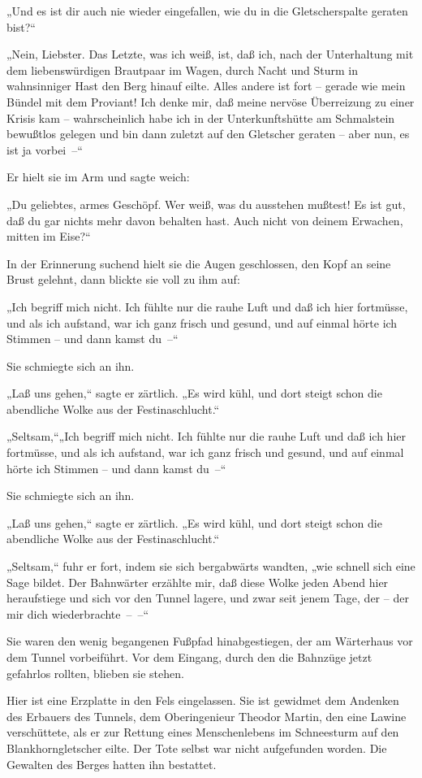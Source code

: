 „Und es ist dir auch nie wieder eingefallen, wie du in die
Gletscherspalte geraten bist?“

„Nein, Liebster. Das Letzte, was ich weiß, ist, daß ich, nach der
Unterhaltung mit dem liebenswürdigen Brautpaar im Wagen, durch
Nacht und Sturm in wahnsinniger Hast den Berg hinauf eilte. Alles
andere ist fort – gerade wie mein Bündel mit dem Proviant! Ich
denke mir, daß meine nervöse Überreizung zu einer Krisis kam –
wahrscheinlich habe ich in der Unterkunftshütte am Schmalstein
bewußtlos gelegen und bin dann zuletzt auf den Gletscher geraten –
aber nun, es ist ja vorbei~–“

Er hielt sie im Arm und sagte weich:

„Du geliebtes, armes Geschöpf. Wer weiß, was du ausstehen mußtest!
Es ist gut, daß du gar nichts mehr davon behalten hast. Auch nicht
von deinem Erwachen, mitten im Eise?“

In der Erinnerung suchend hielt sie die Augen geschlossen, den Kopf
an seine Brust gelehnt, dann blickte sie voll zu ihm auf:

„Ich begriff mich nicht. Ich fühlte nur die rauhe Luft und daß ich
hier fortmüsse, und als ich aufstand, war ich ganz frisch und
gesund, und auf einmal hörte ich Stimmen – und dann kamst du~–“

Sie schmiegte sich an ihn.

„Laß uns gehen,“ sagte er zärtlich. „Es wird kühl, und dort steigt
schon die abendliche Wolke aus der Festinaschlucht.“

„Seltsam,“„Ich begriff mich nicht. Ich fühlte nur die rauhe Luft
und daß ich hier fortmüsse, und als ich aufstand, war ich ganz
frisch und gesund, und auf einmal hörte ich Stimmen – und dann
kamst du~–“

Sie schmiegte sich an ihn.

„Laß uns gehen,“ sagte er zärtlich. „Es wird kühl, und dort steigt
schon die abendliche Wolke aus der Festinaschlucht.“

„Seltsam,“ fuhr er fort, indem sie sich bergabwärts wandten, „wie
schnell sich eine Sage bildet. Der Bahnwärter erzählte mir, daß
diese Wolke jeden Abend hier heraufstiege und sich vor den Tunnel
lagere, und zwar seit jenem Tage, der – der mir dich
wiederbrachte~–~–“

Sie waren den wenig begangenen Fußpfad hinabgestiegen, der am
Wärterhaus vor dem Tunnel vorbeiführt. Vor dem Eingang, durch den
die Bahnzüge jetzt gefahrlos rollten, blieben sie stehen.

Hier ist eine Erzplatte in den Fels eingelassen. Sie ist gewidmet
dem Andenken des Erbauers des Tunnels, dem Oberingenieur Theodor
Martin, den eine Lawine verschüttete, als er zur Rettung eines
Menschenlebens im Schneesturm auf den Blankhorngletscher eilte. Der
Tote selbst war nicht aufgefunden worden. Die Gewalten des Berges
hatten ihn bestattet.

